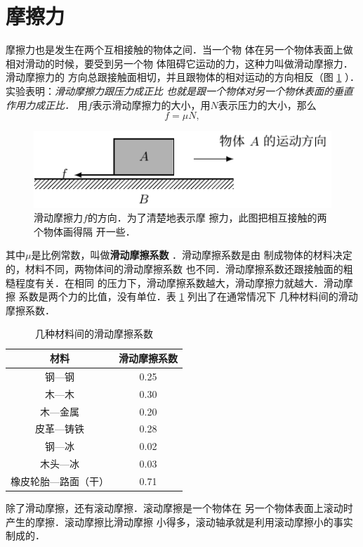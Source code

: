 \section{摩擦力} 
    摩擦力也是发生在两个互相接触的物体之间．当一个物
体在另一个物体表面上做相对滑动的时候，要受到另一个物
体阻碍它运动的力，这种力叫做滑动摩擦力．滑动摩擦力的
方向总跟接触面相切，并且跟物体的相对运动的方向相反（图
 \ref{fig_A_1-12} ）．实验表明：\textit{滑动摩擦力跟压力成正比
也就是跟一个物体对另一个物休表面的垂直作用力成正比．} 
用$f$表示滑动摩擦力的大小，用$N$表示压力的大小，那么
\[f=\mu N,\]
\begin{figure} [htp]\centering
\includegraphics{fig/A/1-12.pdf} 
\caption{滑动摩擦力$f$的方向．为了清楚地表示摩
擦力，此图把相互接触的两个物体画得隔
开一些．
} \label{fig_A_1-12} 
\end{figure} 
其中$\mu$是比例常数，叫做\textbf{滑动摩擦系数} ．滑动摩擦系数是由
制成物体的材料决定的，材料不同，两物体间的滑动摩擦系数
也不同．滑动摩擦系数还跟接触面的粗糙程度有关．在相同
的压力下，滑动摩擦系数越大，滑动摩擦力就越大．滑动摩擦
系数是两个力的比值，没有单位．表 \ref{tab_A_1-1} 列出了在通常情况下
几种材料间的滑动摩擦系数．

\begin{table} [htp]\centering
\caption{几种材料间的滑动摩擦系数} \label{tab_A_1-1} 
\begin{tabular} {cc} 
\hline
材料   &  滑动摩擦系数\\
\hline
钢—钢     & 0.25 \\
木—木   & 0.30 \\
木—金属   &  0.20\\
皮革—铸铁   &  0.28\\
钢—冰   &  0.02\\
木头—冰   &  0.03\\
橡皮轮胎—路面（干）   &  0.71\\
\hline
\end{tabular} 
\end{table} 

    除了滑动摩擦，还有滚动摩擦．滚动摩擦是一个物体在
另一个物体表面上滚动时产生的摩擦．滚动摩擦比滑动摩擦
小得多，滚动轴承就是利用滚动摩擦小的事实制成的．


